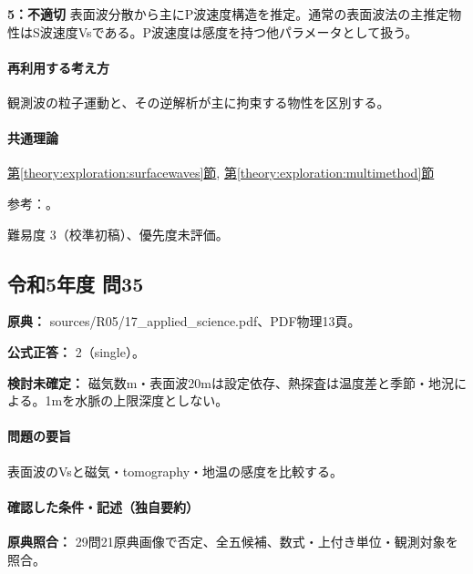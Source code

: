 \noindent\textbf{5：不適切} 表面波分散から主にP波速度構造を推定。通常の表面波法の主推定物性はS波速度Vsである。P波速度は感度を持つ他パラメータとして扱う。\par

\paragraph{再利用する考え方} 観測波の粒子運動と、その逆解析が主に拘束する物性を区別する。

\paragraph{共通理論} \hyperref[theory:exploration:surfacewaves]{第\ref*{theory:exploration:surfacewaves}節}, \hyperref[theory:exploration:multimethod]{第\ref*{theory:exploration:multimethod}節}

\par 参考：\cite{epa_surfacewaves,epa_gpr,rion_vibration2016,gsi_gravity_definitions}。

\par 難易度 3（校準初稿）、優先度未評価。

\subsection{令和5年度 問35}
\label{q:r05-reg-applied-35}

\noindent\textbf{原典：} sources/R05/17\_applied\_science.pdf、PDF物理13頁。

\textbf{公式正答：} 2（single）。

\par\textbf{検討未確定：} 磁気数m・表面波20mは設定依存、熱探査は温度差と季節・地況による。1mを水脈の上限深度としない。

\paragraph{問題の要旨} 表面波のVsと磁気・tomography・地温の感度を比較する。

\paragraph{確認した条件・記述（独自要約）}\mbox{}\par

\noindent\textbf{原典照合：} 29問21原典画像で否定、全五候補、数式・上付き単位・観測対象を照合。\par

